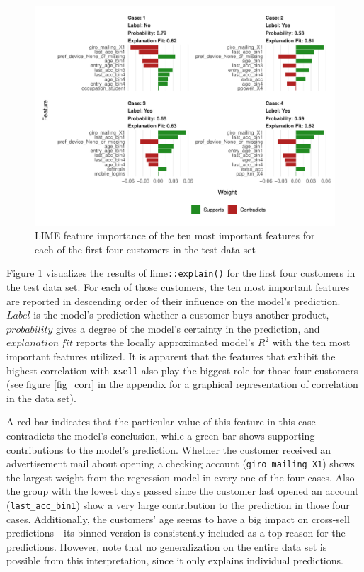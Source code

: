 \documentclass[12pt,a4paper]{article}
\newcommand{\pkg}[1]{{\normalfont\fontseries{b}\selectfont #1}}
\let\code=\texttt
\begin{document}
\begin{figure}[ht]
	\centering
  \includegraphics[scale=0.83]{figures/lime_first_four.pdf}
	\caption{LIME feature importance of the ten most important features for each of the first four customers in the test data set}
	\label{fig_lime_four}
\end{figure}

Figure \ref{fig_lime_four} visualizes the results of \pkg{lime}\code{::explain()} for the first four customers in the test data set.
For each of those customers, the ten most important features are reported in descending order of their influence on the model's prediction.
$Label$ is the model's prediction whether a customer buys another product, $probability$ gives a degree of the model's certainty in the prediction,
and $explanation\ fit$ reports the locally approximated model's $R^2$ with the ten most important features utilized.
It is apparent that the features that exhibit the highest correlation with \code{xsell} also play the biggest role for those four customers 
(see figure \ref{fig_corr} in the appendix for a graphical representation of correlation in the data set). 

A red bar indicates that the particular value of this feature in this case contradicts the model's conclusion,
while a green bar shows supporting contributions to the model's prediction.
Whether the customer received an advertisement mail about opening a checking account (\code{giro\_mailing\_X1}) shows the largest weight from the regression model in every one of the four cases.
Also the group with the lowest days passed since the customer last opened an account (\code{last\_acc\_bin1}) show a very large contribution to the 
prediction in those four cases.
Additionally, the customers' age seems to have a big impact on cross-sell predictions---its binned version is consistently included as a top reason for the predictions.
However, note that no generalization on the entire data set is possible from this interpretation, since it only explains individual predictions.
\end{document}
